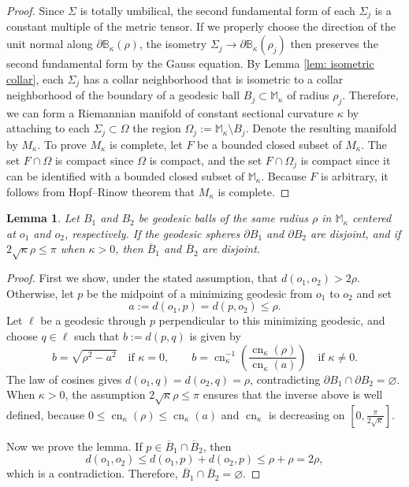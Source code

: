 \documentclass[11pt]{amsart}
\newcommand{\cn}{\operatorname{cn}}
\newtheorem{lemma}[theorem]{Lemma}
\theoremstyle{definition}
\numberwithin{equation}{section}
\begin{document}
\begin{proof}
    Since $\Sigma$ is totally umbilical, the second fundamental form of each $\Sigma_j$ is a constant multiple of the metric tensor. If we properly choose the direction of the unit normal along $\partial\mathbb B_\kappa(\rho)$, the isometry $\Sigma_j\to\partial\mathbb B_\kappa(\rho_j)$ then preserves the second fundamental form by the Gauss equation. By Lemma \ref{lem: isometric collar}, each $\Sigma_j$ has a collar neighborhood that is isometric to a collar neighborhood of the boundary of a geodesic ball $B_j\subset\mathbb M_\kappa$ of radius $\rho_j$. Therefore, we can form a Riemannian manifold of constant sectional curvature $\kappa$ by attaching to each $\Sigma_j\subset\Omega$ the region $\Omega_j := \mathbb M_\kappa\setminus B_j$. Denote the resulting manifold by $M_\kappa$. To prove $M_\kappa$ is complete, let $F$ be a bounded closed subset of $M_\kappa$. The set $F\cap\Omega$ is compact since $\Omega$ is compact, and the set $F\cap\Omega_j$ is compact since it can be identified with a bounded closed subset of $\mathbb M_\kappa$. Because $F$ is arbitrary, it follows from Hopf--Rinow theorem that $M_\kappa$ is complete.
\end{proof}



\begin{lemma}\label{lem: disjoint balls}
    Let $B_1$ and $B_2$ be geodesic balls of the same radius $\rho$ in $\mathbb M_\kappa$ centered at $o_1$ and $o_2$, respectively. If the geodesic spheres $\partial B_1$ and $\partial B_2$ are disjoint, and if $2\sqrt{\kappa}\rho \le \pi$ when $\kappa>0$, then $\overline B_1$ and $\overline B_2$ are disjoint.
\end{lemma}

\begin{proof}
	First we show, under the stated assumption, that $d(o_1,o_2)>2\rho$. Otherwise, let $p$ be the midpoint of a minimizing geodesic from $o_1$ to $o_2$ and set
	\[
	a:=d(o_1,p)=d(p,o_2)\le\rho.
	\]
	Let $\ell$ be a geodesic through $p$ perpendicular to this minimizing geodesic, and choose $q\in\ell$ such that $b:=d(p,q)$ is given by 
	\[
	b=\sqrt{\rho^2-a^2}\quad\text{if }\kappa=0,
	\qquad
	b=\cn_\kappa^{-1}\!\left(\frac{\cn_\kappa(\rho)}{\cn_\kappa(a)}\right)
	\quad\text{if }\kappa\ne0.
	\]
	The law of cosines gives $d(o_1,q)=d(o_2,q)=\rho$, contradicting $\partial B_1\cap\partial B_2=\varnothing$. When $\kappa>0$, the assumption $2\sqrt{\kappa}\rho\le\pi$ ensures that the inverse above is well defined, because $0\le\cn_\kappa(\rho)\le\cn_\kappa(a)$ and $\cn_\kappa$ is decreasing on $[0,\frac{\pi}{2\sqrt{\kappa}}]$.
	
	Now we prove the lemma. If $p\in \overline B_1\cap \overline B_2$, then 
	\[d(o_1,o_2) \le d(o_1,p) + d(o_2,p) \le \rho + \rho = 2\rho,\]
	which is a contradiction. Therefore, $\overline B_1\cap\overline B_2=\varnothing$.
\end{proof} 
\end{document}
